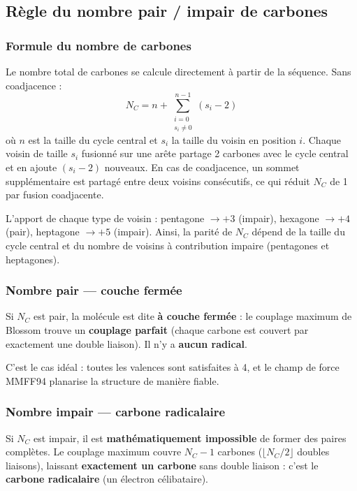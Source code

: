 \documentclass[a4paper,12pt]{article}
\begin{document}
\subsection{Règle du nombre pair / impair de carbones}

\subsubsection{Formule du nombre de carbones}

Le nombre total de carbones se calcule directement à partir de la séquence. Sans coadjacence :
\[
  N_C = n + \sum_{\substack{i=0 \\ s_i \neq 0}}^{n-1} (s_i - 2)
\]
où $n$ est la taille du cycle central et $s_i$ la taille du voisin en position $i$. Chaque
voisin de taille $s_i$ fusionné sur une arête partage 2 carbones avec le cycle central et en
ajoute $(s_i - 2)$ nouveaux. En cas de coadjacence, un sommet supplémentaire est partagé entre
deux voisins consécutifs, ce qui réduit $N_C$ de 1 par fusion coadjacente.

\begin{remarque}
  L'apport de chaque type de voisin : pentagone $\to +3$ (impair), hexagone $\to +4$ (pair),
  heptagone $\to +5$ (impair). Ainsi, la parité de $N_C$ dépend de la taille du cycle central
  et du nombre de voisins à contribution impaire (pentagones et heptagones).
\end{remarque}

\subsubsection{Nombre pair — couche fermée}

Si $N_C$ est pair, la molécule est dite \textbf{à couche fermée} : le couplage maximum de
Blossom trouve un \textbf{couplage parfait} (chaque carbone est couvert par exactement une
double liaison). Il n'y a \textbf{aucun radical}.

C'est le cas idéal : toutes les valences sont satisfaites à 4, et le champ de force MMFF94
planarise la structure de manière fiable.

\subsubsection{Nombre impair — carbone radicalaire}

Si $N_C$ est impair, il est \textbf{mathématiquement impossible} de former des paires complètes.
Le couplage maximum couvre $N_C - 1$ carbones ($\lfloor N_C / 2 \rfloor$ doubles liaisons),
laissant \textbf{exactement un carbone} sans double liaison : c'est le \textbf{carbone
radicalaire} (un électron célibataire).
\end{document}
